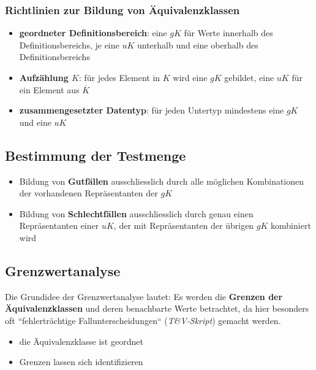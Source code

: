 \subsubsection{Richtlinien zur Bildung von Äquivalenzklassen}

\begin{itemize}
    \item \textbf{geordneter Definitionsbereich}: eine $gK$ für Werte innerhalb des Definitionsbereichs, je eine $uK$ unterhalb und eine oberhalb des Definitionsbereichs
    \item \textbf{Aufzählung $K$}: für jedes Element in $K$ wird eine $gK$ gebildet, eine $uK$ für ein Element aus $\overline{K}$
    \item \textbf{zusammengesetzter Datentyp}: für jeden Untertyp mindestens eine $gK$ und eine $uK$
\end{itemize}

\subsection*{Bestimmung der Testmenge}

\begin{itemize}
    \item Bildung von \textbf{Gutfällen} ausschliesslich durch alle möglichen Kombinationen der vorhandenen Repräsentanten der $gK$
    \item Bildung von \textbf{Schlechtfällen} ausschliesslich durch genau einen Repräsentanten einer $uK$, der mit Repräsentanten der übrigen $gK$ kombiniert wird
\end{itemize}

\subsection*{Grenzwertanalyse}

Die Grundidee der Grenzwertanalyse lautet: Es werden die \textbf{Grenzen der Äquivalenzklassen} und deren benachbarte Werte betrachtet, da hier besonders oft ``fehlerträchtige Fallunterscheidungen`` (\textit{T\&V-Skript}) gemacht werden.

\vspace{5mm}
\begin{tcolorbox}[title={Vorraussetzungen für die Grenzwertanalyse}]
    \begin{itemize}
        \item die Äquivalenzklasse ist geordnet
        \item Grenzen lassen sich identifizieren
    \end{itemize}
\end{tcolorbox}

